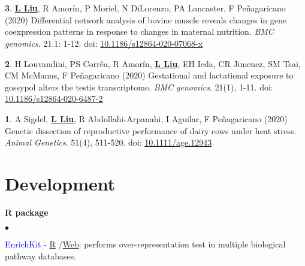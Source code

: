 \documentclass[margin,line,10pt]{res}
\newenvironment{list1}{
  \begin{list}{\ding{113}}{%
      \setlength{\itemsep}{0in}
      \setlength{\parsep}{0in} \setlength{\parskip}{0in}
      \setlength{\topsep}{0in} \setlength{\partopsep}{0in} 
      \setlength{\leftmargin}{0.17in}}}{\end{list}}
\newenvironment{list2}{
  \begin{list}{$\bullet$}{%
      \setlength{\itemsep}{0in}
      \setlength{\parsep}{0in} \setlength{\parskip}{0in}
      \setlength{\topsep}{0in} \setlength{\partopsep}{0in} 
      \setlength{\leftmargin}{0.2in}}}{\end{list}}
\begin{document}
\begin{resume}
\section{}
\begin{list1}

\item [{\bf 3}.] \textbf{\underline{L Liu}}, R Amorín, P Moriel, N DiLorenzo, PA Lancaster, F Peñagaricano (2020) Differential network analysis of bovine muscle reveals changes in gene coexpression patterns in response to changes in maternal nutrition. \emph{BMC genomics}. 21.1: 1-12. doi: \textcolor{blue}{\href{https://doi.org/10.1186/s12864-020-07068-x}{10.1186/s12864-020-07068-x}}
    \vspace{0.2cm}
    
\item [{\bf 2}.] H Louvandini, PS Corrêa, R Amorín, \textbf{\underline{L Liu}}, EH Ieda, CR Jimenez, SM Tsai, CM McManus, F Peñagaricano (2020) Gestational and lactational exposure to gossypol alters the testis transcriptome. \emph{BMC genomics}. 21(1), 1-11. doi: \textcolor{blue}{\href{https://doi.org/10.1186/s12864-020-6487-2}{10.1186/s12864-020-6487-2}}
    \vspace{0.2cm}
    
\item [{\bf 1}.] A Sigdel, \textbf{\underline{L Liu}}, R Abdollahi‐Arpanahi, I Aguilar, F Peñagaricano (2020) Genetic dissection of reproductive performance of dairy cows under heat stress. \emph{Animal Genetics}. 51(4), 511-520. doi: \textcolor{blue}{\href{https://onlinelibrary.wiley.com/doi/full/10.1111/age.12943}{10.1111/age.12943}}
    \vspace{0.2cm}
\end{list1}

\vspace*{-.05in}
\section{ \phantom{1cm} {\bf Development}}
\textbf {R package}\\
\vspace*{-.15in}
\begin{list1}
\item[]
\begin{list2}
\vspace*{.05in}
\item \textcolor{blue}{EnrichKit} - \textcolor{blue}{\href{https://github.com/liulihe954/EnrichKit}{R}} /\textcolor{blue}{\href{https://github.com/liulihe954/EnrichKitWeb}{Web}}: performs over-representation test in multiple biological pathway databases. 


\end{list2}
\end{list1}
\end{resume}
\end{document}

